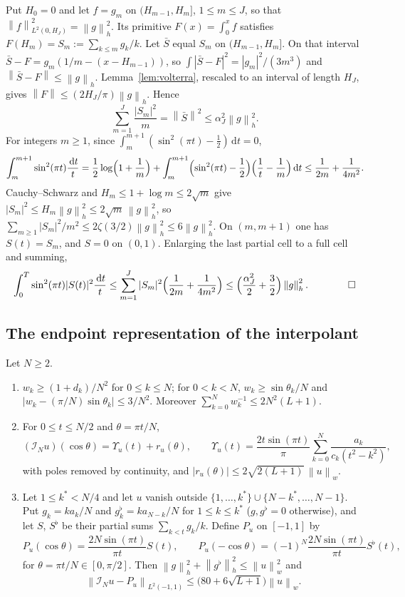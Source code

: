 \documentclass{siamart251216}
\newcommand{\norm}[1]{\left\lVert#1\right\rVert}
\newcommand{\dd}{\,\mathrm d}
\begin{document}
Put $H_0=0$ and let $f=g_m$ on $(H_{m-1},H_m]$, $1\le m\le J$, so that
$\norm f_{L^2(0,H_J)}^2=\norm g_h^2$. Its primitive
$F(x)=\int_0^xf$ satisfies $F(H_m)=S_m:=\sum_{k\le m}g_k/k$. Let $\bar S$
equal $S_m$ on $(H_{m-1},H_m]$. On that interval
$\bar S-F=g_m(1/m-(x-H_{m-1}))$, so $\int|\bar S-F|^2=|g_m|^2/(3m^3)$ and
$\norm{\bar S-F}\le\norm g_h$. Lemma~\ref{lem:volterra}, rescaled to an
interval of length $H_J$, gives $\norm F\le(2H_J/\pi)\norm g_h$. Hence
\begin{equation}\label{eq:Sm-sum}
 \sum_{m=1}^J\frac{|S_m|^2}m=\norm{\bar S}^2\le\alpha_J^2\norm g_h^2 .
\end{equation}
For integers $m\ge1$, since $\int_m^{m+1}(\sin^2(\pi t)-\tfrac12)\dd t=0$,
\[
 \int_m^{m+1}\sin^2(\pi t)\frac{\dd t}t
 =\frac12\log\Bigl(1+\frac1m\Bigr)
 +\int_m^{m+1}\Bigl(\sin^2(\pi t)-\frac12\Bigr)\Bigl(\frac1t-\frac1m\Bigr)\dd t
 \le\frac1{2m}+\frac1{4m^2}.
\]
Cauchy--Schwarz and $H_m\le1+\log m\le2\sqrt m$ give
$|S_m|^2\le H_m\norm g_h^2\le2\sqrt m\,\norm g_h^2$, so
$\sum_{m\ge1}|S_m|^2/m^2\le2\zeta(3/2)\norm g_h^2\le6\norm g_h^2$.
On $(m,m+1)$ one has $S(t)=S_m$, and $S=0$ on $(0,1)$. Enlarging the
last partial cell to a full cell and summing,
\[
 \int_0^T\sin^2(\pi t)|S(t)|^2\frac{\dd t}t
 \le\sum_{m=1}^J|S_m|^2\Bigl(\frac1{2m}+\frac1{4m^2}\Bigr)
 \le\Bigl(\frac{\alpha_J^2}2+\frac32\Bigr)\norm g_h^2. \qquad\qed
\]

\subsection{The endpoint representation of the interpolant}

\begin{lemma}\label{lem:endpoint-rep}
Let $N\ge2$.
\begin{enumerate}
\item[(a)] $w_k\ge(1+d_k)/N^2$ for $0\le k\le N$; for $0<k<N$,
$w_k\ge\sin\theta_k/N$ and $|w_k-(\pi/N)\sin\theta_k|\le3/N^2$. Moreover
$\sum_{k=0}^Nw_k^{-1}\le2N^2(L+1)$.
\item[(b)] For $0\le t\le N/2$ and $\theta=\pi t/N$,
\[
 (\mathcal I_Nu)(\cos\theta)=\Upsilon_u(t)+r_u(\theta),\qquad
 \Upsilon_u(t)=\frac{2t\sin(\pi t)}\pi\sum_{k=0}^N\frac{a_k}{c_k(t^2-k^2)},
\]
with poles removed by continuity, and
$|r_u(\theta)|\le2\sqrt{2(L+1)}\,\norm u_w$.
\item[(c)] Let $1\le k^\ast<N/4$ and let $u$ vanish outside
$\{1,\dots,k^\ast\}\cup\{N-k^\ast,\dots,N-1\}$. Put $g_k=ka_k/N$ and
$g^\flat_k=ka_{N-k}/N$ for $1\le k\le k^\ast$ ($g,g^\flat=0$ otherwise), and
let $S$, $S^\flat$ be their partial sums $\sum_{k<t}g_k/k$. Define
$P_u$ on $[-1,1]$ by
\[
 P_u(\cos\theta)=\frac{2N\sin(\pi t)}{\pi t}S(t),\qquad
 P_u(-\cos\theta)=(-1)^N\frac{2N\sin(\pi t)}{\pi t}S^\flat(t),
\]
for $\theta=\pi t/N\in[0,\pi/2]$. Then
$\norm g_h^2+\norm{g^\flat}_h^2\le\norm u_w^2$ and
\[
 \norm{\mathcal I_Nu-P_u}_{L^2(-1,1)}\le\bigl(80+6\sqrt{L+1}\bigr)\norm u_w .
\]
\end{enumerate}
\end{lemma}
\end{document}
